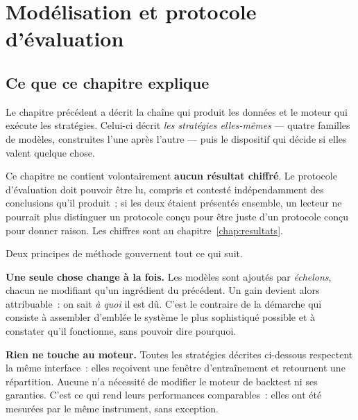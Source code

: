 %

\chapter{Modélisation et protocole d'évaluation}
\label{chap:modelisation}

\section*{Ce que ce chapitre explique}

Le chapitre précédent a décrit la chaîne qui produit les données et le moteur
qui exécute les stratégies. Celui-ci décrit \emph{les stratégies elles-mêmes} —
quatre familles de modèles, construites l'une après l'autre — puis le dispositif
qui décide si elles valent quelque chose.

Ce chapitre ne contient volontairement \textbf{aucun résultat chiffré}. Le
protocole d'évaluation doit pouvoir être lu, compris et contesté indépendamment
des conclusions qu'il produit~; si les deux étaient présentés ensemble, un
lecteur ne pourrait plus distinguer un protocole conçu pour être juste d'un
protocole conçu pour donner raison. Les chiffres sont au
chapitre~\ref{chap:resultats}.

Deux principes de méthode gouvernent tout ce qui suit.

\textbf{Une seule chose change à la fois.} Les modèles sont ajoutés par
\emph{échelons}, chacun ne modifiant qu'un ingrédient du précédent. Un gain
devient alors attribuable~: on sait \emph{à quoi} il est dû. C'est le contraire
de la démarche qui consiste à assembler d'emblée le système le plus sophistiqué
possible et à constater qu'il fonctionne, sans pouvoir dire pourquoi.

\textbf{Rien ne touche au moteur.} Toutes les stratégies décrites ci-dessous
respectent la même interface~: elles reçoivent une fenêtre d'entraînement et
retournent une répartition. Aucune n'a nécessité de modifier le moteur de
backtest ni ses garanties. C'est ce qui rend leurs performances comparables~:
elles ont été mesurées par le même instrument, sans exception.

